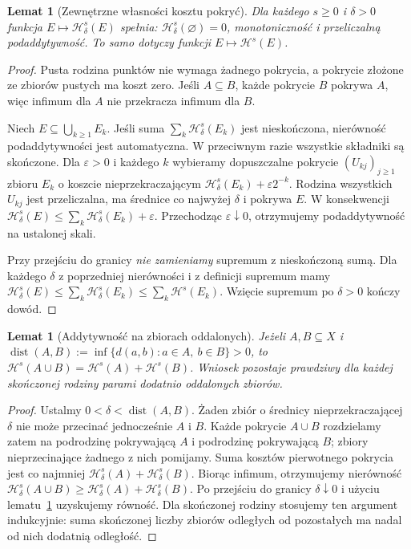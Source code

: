 \documentclass[11pt,a4paper,oneside]{book}
\numberwithin{equation}{chapter}
\theoremstyle{plain}
\newtheorem{lemat}[twierdzenie]{Lemat}
\theoremstyle{definition}
\theoremstyle{remark}
\begin{document}
\begin{lemat}[Zewnętrzne własności kosztu pokryć]
\label{lem:hausdorff-outer-26}
Dla każdego $s\geq0$ i $\delta>0$ funkcja
$E\mapsto\mathcal H^s_\delta(E)$ spełnia:
$\mathcal H^s_\delta(\varnothing)=0$,
monotoniczność i przeliczalną podaddytywność.
To samo dotyczy funkcji $E\mapsto\mathcal H^s(E)$.
\end{lemat}
\begin{proof}
Pusta rodzina punktów nie wymaga żadnego pokrycia,
a pokrycie złożone ze zbiorów pustych ma koszt zero.
Jeśli $A\subseteq B$, każde pokrycie $B$ pokrywa $A$,
więc infimum dla $A$ nie przekracza infimum dla $B$.

Niech $E\subseteq\bigcup_{k\ge1}E_k$. Jeśli suma
$\sum_k\mathcal H^s_\delta(E_k)$ jest nieskończona,
nierówność podaddytywności jest automatyczna.
W przeciwnym razie wszystkie składniki są skończone.
Dla $\varepsilon>0$ i każdego $k$ wybieramy dopuszczalne
pokrycie $(U_{kj})_{j\ge1}$ zbioru $E_k$ o koszcie
nieprzekraczającym
$\mathcal H^s_\delta(E_k)+\varepsilon2^{-k}$.
Rodzina wszystkich $U_{kj}$ jest przeliczalna,
ma średnice co najwyżej $\delta$ i pokrywa $E$.
W konsekwencji
$\mathcal H^s_\delta(E)\leq
\sum_k\mathcal H^s_\delta(E_k)+\varepsilon$.
Przechodząc $\varepsilon\downarrow0$, otrzymujemy
podaddytywność na ustalonej skali.

Przy przejściu do granicy \emph{nie zamieniamy}
supremum z nieskończoną sumą. Dla każdego $\delta$
z poprzedniej nierówności i z definicji supremum mamy
$\mathcal H^s_\delta(E)\leq
\sum_k\mathcal H^s_\delta(E_k)
\leq\sum_k\mathcal H^s(E_k)$.
Wzięcie supremum po $\delta>0$ kończy dowód.
\end{proof}

\begin{lemat}[Addytywność na zbiorach oddalonych]
\label{lem:hausdorff-metricity-26}
Jeżeli $A,B\subseteq X$ i
$\operatorname{dist}(A,B):=
\inf\{d(a,b):a\in A,\ b\in B\}>0$,
to $\mathcal H^s(A\cup B)=\mathcal H^s(A)+\mathcal H^s(B)$.
Wniosek pozostaje prawdziwy dla każdej skończonej
rodziny parami dodatnio oddalonych zbiorów.
\end{lemat}
\begin{proof}
Ustalmy $0<\delta<\operatorname{dist}(A,B)$.
Żaden zbiór o średnicy nieprzekraczającej $\delta$
nie może przecinać jednocześnie $A$ i $B$.
Każde pokrycie $A\cup B$ rozdzielamy zatem na
podrodzinę pokrywającą $A$ i podrodzinę pokrywającą
$B$; zbiory nieprzecinające żadnego z nich pomijamy.
Suma kosztów pierwotnego pokrycia jest co najmniej
$\mathcal H^s_\delta(A)+\mathcal H^s_\delta(B)$.
Biorąc infimum, otrzymujemy nierówność
$\mathcal H^s_\delta(A\cup B)\geq
\mathcal H^s_\delta(A)+\mathcal H^s_\delta(B)$.
Po przejściu do granicy $\delta\downarrow0$
i użyciu lematu~\ref{lem:hausdorff-outer-26}
uzyskujemy równość. Dla skończonej rodziny
stosujemy ten argument indukcyjnie: suma skończonej
liczby zbiorów odległych od pozostałych ma nadal
od nich dodatnią odległość.
\end{proof}
\end{document}
